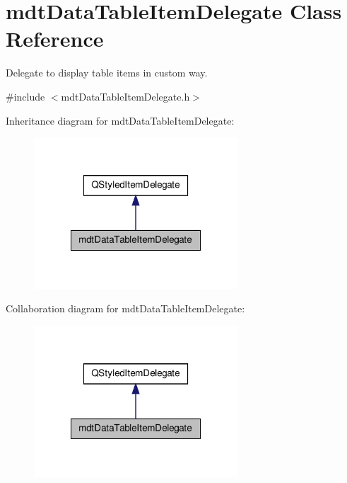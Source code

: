 \hypertarget{classmdt_data_table_item_delegate}{\section{mdt\-Data\-Table\-Item\-Delegate Class Reference}
\label{classmdt_data_table_item_delegate}
}


Delegate to display table items in custom way.  




{\ttfamily \#include $<$mdt\-Data\-Table\-Item\-Delegate.\-h$>$}



Inheritance diagram for mdt\-Data\-Table\-Item\-Delegate\-:\nopagebreak
\begin{figure}[H]
\begin{center}
\leavevmode
\includegraphics[width=216pt]{classmdt_data_table_item_delegate__inherit__graph}
\end{center}
\end{figure}


Collaboration diagram for mdt\-Data\-Table\-Item\-Delegate\-:\nopagebreak
\begin{figure}[H]
\begin{center}
\leavevmode
\includegraphics[width=216pt]{classmdt_data_table_item_delegate__coll__graph}
\end{center}
\end{figure}

